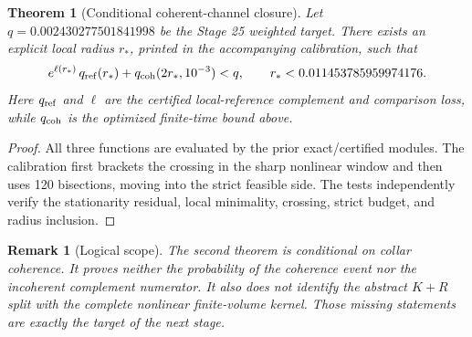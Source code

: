 \documentclass[11pt]{article}
\newtheorem{theorem}{Theorem}
\newtheorem{remark}{Remark}
\begin{document}
\begin{theorem}[Conditional coherent-channel closure]
Let $q=0.002430277501841998$ be the Stage 25 weighted target.  There exists an
explicit local radius $r_*$, printed in the accompanying calibration, such
that
\[
 e^{\ell(r_*)}\,q_{\rm ref}(r_*)
 +q_{\rm coh}(2r_*,10^{-3})<q,
 \qquad r_*<0.011453785959974176.
\]
Here $q_{\rm ref}$ and $\ell$ are the certified local-reference complement and
comparison loss, while $q_{\rm coh}$ is the optimized finite-time bound above.
\end{theorem}

\begin{proof}
All three functions are evaluated by the prior exact/certified modules.  The
calibration first brackets the crossing in the sharp nonlinear window and
then uses 120 bisections, moving into the strict feasible side.  The tests
independently verify the stationarity residual, local minimality, crossing,
strict budget, and radius inclusion.
\end{proof}

\begin{remark}[Logical scope]
The second theorem is conditional on collar coherence.  It proves neither the
probability of the coherence event nor the incoherent complement numerator.
It also does not identify the abstract $K+R$ split with the complete nonlinear
finite-volume kernel.  Those missing statements are exactly the target of the
next stage.
\end{remark}
\end{document}

